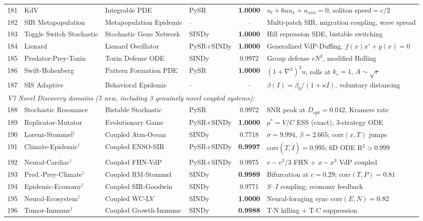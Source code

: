 \begin{table}[t]
\begin{tabular}{rlllcl}
181 & KdV & Integrable PDE & PySR & \textbf{1.0000} & $u_t + 6uu_x + u_{xxx} = 0$, soliton speed$=c/2$ \\
182 & SIR Metapopulation & Metapopulation Epidemic & -- & -- & Multi-patch SIR, migration coupling, wave spread \\
183 & Toggle Switch Stochastic & Stochastic Gene Network & SINDy & \textbf{1.0000} & Hill repression SDE, bistable switching \\
184 & Lienard & Lienard Oscillator & PySR+SINDy & \textbf{1.0000} & Generalized VdP-Duffing, $f(x)x' + g(x) = 0$ \\
185 & Predator-Prey-Toxin & Toxin Defense ODE & SINDy & 0.9972 & Group defense $c N^2$, modified Holling \\
186 & Swift-Hohenberg & Pattern Formation PDE & PySR & \textbf{1.0000} & $(1+\nabla^2)^2 u$, rolls at $k_c=1$, $A\sim\sqrt{r}$ \\
187 & SIS Adaptive & Behavioral Epidemic & -- & -- & $\beta(I)=\beta_0/(1+\kappa I)$, voluntary distancing \\
\midrule
\multicolumn{6}{l}{\textit{V7 Novel Discovery domains (5 new, including 3 genuinely novel coupled systems):}} \\
\midrule
188 & Stochastic Resonance & Bistable Stochastic & PySR & 0.9972 & SNR peak at $D_\text{opt}=0.042$, Kramers rate \\
189 & Replicator-Mutator & Evolutionary Game & PySR+SINDy & \textbf{1.0000} & $p^*=V/C$ ESS (exact), 3-strategy ODE \\
190 & Lorenz-Stommel$^\dagger$ & Coupled Atm-Ocean & SINDy & 0.7718 & $\sigma{=}9.994$, $\beta{=}2.665$; corr$(x,T)$ jumps \\
191 & Climate-Epidemic$^\dagger$ & Coupled ENSO-SIR & PySR+SINDy & \textbf{0.9997} & corr$(T, \dot{I})=0.995$; 6D ODE R$^2>0.999$ \\
192 & Neural-Cardiac$^\dagger$ & Coupled FHN-VdP & PySR+SINDy & 0.9975 & $v{-}v^3/3$ FHN + $x{-}x^3$ VdP coupled \\
\midrule
193 & Pred.-Prey-Climate$^\dagger$ & Coupled RM-Stommel & SINDy & \textbf{0.9989} & Bifurcation at $c{=}0.29$; corr$(T,P){=}0.81$ \\
194 & Epidemic-Economy$^\dagger$ & Coupled SIR-Goodwin & SINDy & 0.9771 & $S{\cdot}I$ coupling; economy feedback \\
195 & Neural-Ecosystem$^\dagger$ & Coupled WC-LV & SINDy & \textbf{1.0000} & Neural-foraging sync corr$(E,N){=}0.82$ \\
196 & Tumor-Immune$^\dagger$ & Coupled Growth-Immune & SINDy & \textbf{0.9988} & T${\cdot}$N killing + T${\cdot}$C suppression \\

\end{tabular}
\end{table}
